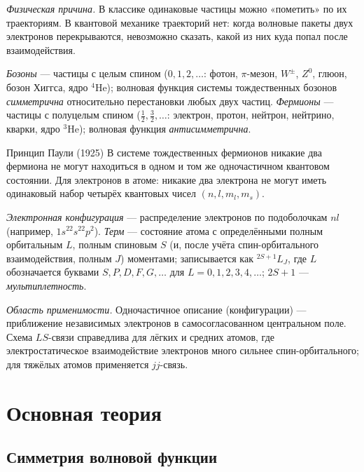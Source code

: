 \emph{Физическая причина.} В классике одинаковые частицы можно «пометить» по их траекториям. В квантовой
механике траекторий нет: когда волновые пакеты двух электронов перекрываются, невозможно сказать,
какой из них куда попал после взаимодействия.

\begin{definition}
\emph{Бозоны} — частицы с целым спином ($0,1,2,\dots$: фотон, $\pi$-мезон, $W^\pm$, $Z^0$, глюон, бозон Хиггса,
ядро $^4$He); волновая функция системы тождественных бозонов \emph{симметрична} относительно перестановки любых
двух частиц. \emph{Фермионы} — частицы с полуцелым спином ($\frac12,\frac32,\dots$: электрон, протон, нейтрон,
нейтрино, кварки, ядро $^3$He); волновая функция \emph{антисимметрична}.
\end{definition}

\begin{principle}{Принцип Паули (1925)}
В системе тождественных фермионов никакие два фермиона не могут находиться в одном и том же
одночастичном квантовом состоянии. Для электронов в атоме: никакие два электрона не могут иметь
одинаковый набор четырёх квантовых чисел $(n,l,m_l,m_s)$.
\end{principle}

\begin{definition}
\emph{Электронная конфигурация} — распределение электронов по подоболочкам $nl$ (например, $1s^22s^22p^2$).
\emph{Терм} — состояние атома с определёнными полным орбитальным $L$, полным спиновым $S$ (и, после учёта
спин-орбитального взаимодействия, полным $J$) моментами; записывается как $^{2S+1}L_J$, где $L$ обозначается
буквами $S,P,D,F,G,\dots$ для $L=0,1,2,3,4,\dots$; $2S+1$ — \emph{мультиплетность}.
\end{definition}

\emph{Область применимости.} Одночастичное описание (конфигурации) — приближение независимых электронов в
самосогласованном центральном поле. Схема $LS$-связи справедлива для лёгких и средних атомов, где
электростатическое взаимодействие электронов много сильнее спин-орбитального; для тяжёлых атомов
применяется $jj$-связь.

\section{Основная теория}

\subsection{Симметрия волновой функции}

